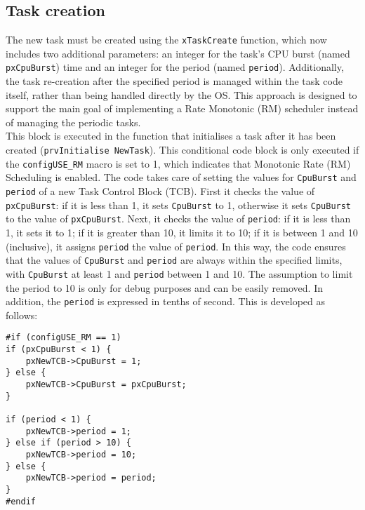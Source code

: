 \subsection{Task creation} \label{sec:2.2}
The new task must be created using the \texttt{xTaskCreate} function, which now includes two additional parameters: an integer for the task's CPU burst (named \texttt{pxCpuBurst}) time and an integer for the period (named \texttt{period}). Additionally, the task re-creation after the specified period is managed within the task code itself, rather than being handled directly by the OS. This approach is designed to support the main goal of implementing a Rate Monotonic (RM) scheduler instead of managing the periodic tasks.\\

\noindent This block is executed in the function that initialises a task after it has been created (\texttt{prvInitialise
NewTask}). This conditional code block is only executed if the \texttt{configUSE\_RM} macro is set to 1, which indicates that Monotonic Rate (RM) Scheduling is enabled. The code takes care of setting the values for \texttt{CpuBurst} and \texttt{period} of a new Task Control Block (TCB). First it checks the value of \texttt{pxCpuBurst}: if it is less than 1, it sets \texttt{CpuBurst} to 1, otherwise it sets \texttt{CpuBurst} to the value of \texttt{pxCpuBurst}. Next, it checks the value of \texttt{period}: if it is less than 1, it sets it to 1; if it is greater than 10, it limits it to 10; if it is between 1 and 10 (inclusive), it assigns \texttt{period} the value of \texttt{period}. In this way, the code ensures that the values of \texttt{CpuBurst} and \texttt{period} are always within the specified limits, with \texttt{CpuBurst} at least 1 and \texttt{period} between 1 and 10. The assumption to limit the period to 10 is only for debug purposes and can be easily removed. In addition, the \texttt{period} is expressed in tenths of second. This is developed as follows:
\begin{lstlisting}
#if (configUSE_RM == 1)
if (pxCpuBurst < 1) {
    pxNewTCB->CpuBurst = 1;
} else {
    pxNewTCB->CpuBurst = pxCpuBurst;
}

if (period < 1) {
    pxNewTCB->period = 1;
} else if (period > 10) {
    pxNewTCB->period = 10;
} else {
    pxNewTCB->period = period;
}
#endif
\end{lstlisting}


